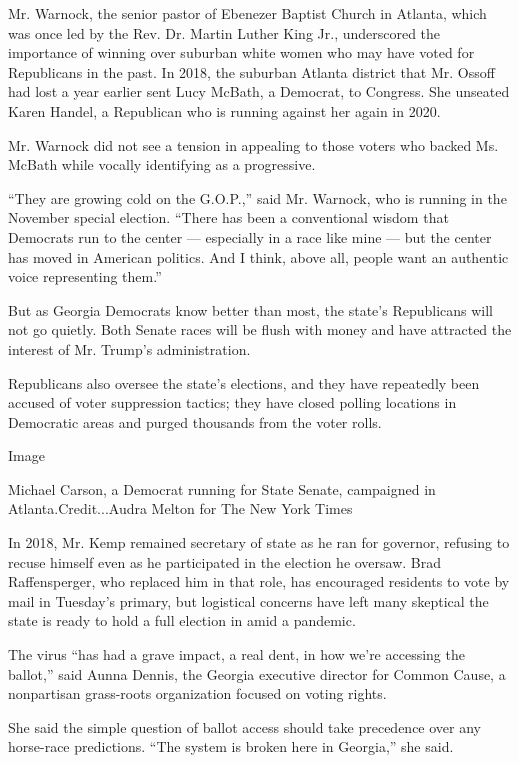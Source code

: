 Mr. Warnock, the senior pastor of Ebenezer Baptist Church in Atlanta,
which was once led by the Rev. Dr. Martin Luther King Jr., underscored
the importance of winning over suburban white women who may have voted
for Republicans in the past. In 2018, the suburban Atlanta district that
Mr. Ossoff had lost a year earlier sent Lucy McBath, a Democrat, to
Congress. She unseated Karen Handel, a Republican who is running against
her again in 2020.

Mr. Warnock did not see a tension in appealing to those voters who
backed Ms. McBath while vocally identifying as a progressive.

``They are growing cold on the G.O.P.,'' said Mr. Warnock, who is
running in the November special election. ``There has been a
conventional wisdom that Democrats run to the center --- especially in a
race like mine --- but the center has moved in American politics. And I
think, above all, people want an authentic voice representing them.''

But as Georgia Democrats know better than most, the state's Republicans
will not go quietly. Both Senate races will be flush with money and have
attracted the interest of Mr. Trump's administration.

Republicans also oversee the state's elections, and they have repeatedly
been accused of voter suppression tactics; they have closed polling
locations in Democratic areas and purged thousands from the voter rolls.

Image

Michael Carson, a Democrat running for State Senate, campaigned in
Atlanta.Credit...Audra Melton for The New York Times

In 2018, Mr. Kemp remained secretary of state as he ran for governor,
refusing to recuse himself even as he participated in the election he
oversaw. Brad Raffensperger, who replaced him in that role, has
encouraged residents to vote by mail in Tuesday's primary, but
logistical concerns have left many skeptical the state is ready to hold
a full election in amid a pandemic.

The virus ``has had a grave impact, a real dent, in how we're accessing
the ballot,'' said Aunna Dennis, the Georgia executive director for
Common Cause, a nonpartisan grass-roots organization focused on voting
rights.

She said the simple question of ballot access should take precedence
over any horse-race predictions. ``The system is broken here in
Georgia,'' she said.

